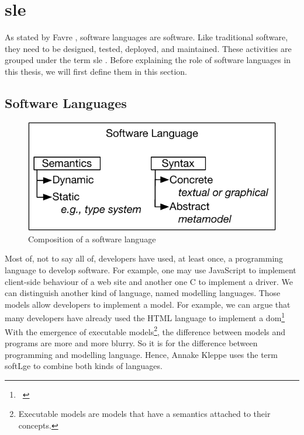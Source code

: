 \section[Software Language Engineering]{\glsdesc{sle}}
\label{sec:back:sle}

As stated by Favre \etal \cite{DBLP:conf/sle/FavreGLP10}, software languages are software.
Like traditional software, they need to be designed, tested, deployed, and maintained.
These activities are grouped under the term \gls{sle} \cite{kleppe2008software}.
Before explaining the role of software languages in this thesis, we will first define them in this section.

\subsection{Software Languages}

\begin{figure}
	\centering
	\includegraphics[width=0.5\linewidth]{img/chapt-background/sle/language}
	\caption{Composition of a software language}
	\label{fig:background:sle:lang}
\end{figure}

Most of, not to say all of, developers have used, at least once, a programming language to develop software.
For example, one may use JavaScript to implement client-side behaviour of a web site and another one C to implement a driver.
We can distinguish another kind of language, named modelling languages.
Those models allow developers to implement a model.
For example, we can argue that many developers have already used the HTML language to implement a \gls{dom}\footnote{~\cite{DOM:Spec}}
With the emergence of executable models\footnote{Executable models are models that have a semantics attached to their concepts.}, the difference between models and programs are more and more blurry.
So it is for the difference between programming and modelling language.
Hence, Annake Kleppe uses the term \gls{softLge} to combine both kinds of languages.

